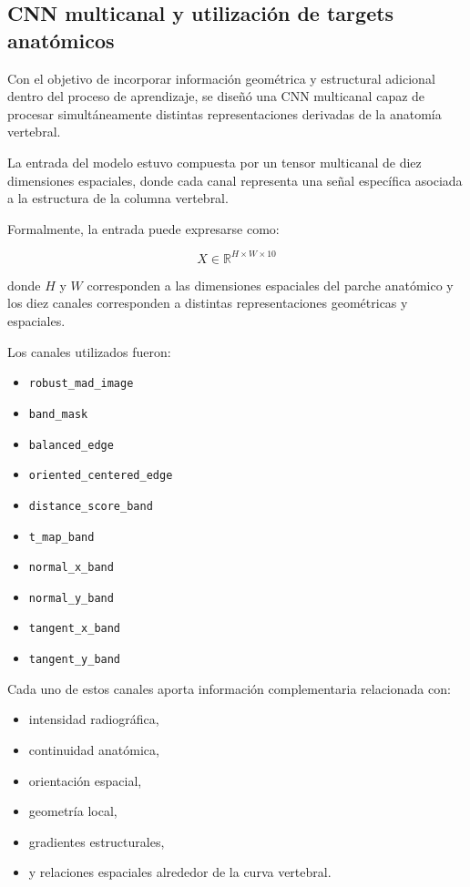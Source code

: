 \documentclass[conference]{IEEEtran}
\begin{document}
\subsection{CNN multicanal y utilización de targets anatómicos}

Con el objetivo de incorporar información geométrica y estructural adicional dentro del proceso de aprendizaje, se diseñó una CNN multicanal capaz de procesar simultáneamente distintas representaciones derivadas de la anatomía vertebral.

La entrada del modelo estuvo compuesta por un tensor multicanal de diez dimensiones espaciales, donde cada canal representa una señal específica asociada a la estructura de la columna vertebral.

Formalmente, la entrada puede expresarse como:

\[
X \in \mathbb{R}^{H \times W \times 10}
\]

donde $H$ y $W$ corresponden a las dimensiones espaciales del parche anatómico y los diez canales corresponden a distintas representaciones geométricas y espaciales.

Los canales utilizados fueron:

\begin{itemize}
    \item \texttt{robust\_mad\_image}
    \item \texttt{band\_mask}
    \item \texttt{balanced\_edge}
    \item \texttt{oriented\_centered\_edge}
    \item \texttt{distance\_score\_band}
    \item \texttt{t\_map\_band}
    \item \texttt{normal\_x\_band}
    \item \texttt{normal\_y\_band}
    \item \texttt{tangent\_x\_band}
    \item \texttt{tangent\_y\_band}
\end{itemize}

Cada uno de estos canales aporta información complementaria relacionada con:

\begin{itemize}
    \item intensidad radiográfica,
    \item continuidad anatómica,
    \item orientación espacial,
    \item geometría local,
    \item gradientes estructurales,
    \item y relaciones espaciales alrededor de la curva vertebral.
\end{itemize}
\end{document}
